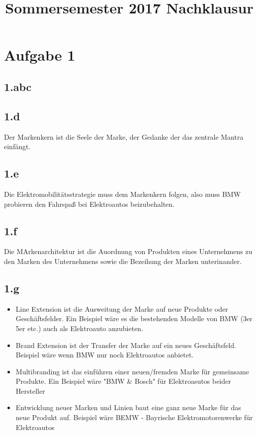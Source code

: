 

\title{Sommersemester 2017 Nachklausur}
\maketitle



\section{Aufgabe 1}
\subsection{1.abc}

\subsection{1.d}
    Der Markenkern ist die Seele der Marke, der Gedanke der das zentrale Mantra einfängt.

\subsection{1.e}
    Die Elektromobilitätsstrategie muss dem Markenkern folgen, also muss BMW probieren den Fahrspaß bei Elektroautos beizubehalten.

\subsection{1.f}
    Die MArkenarchitektur ist die Auordnung von Produkten eines Unternehmens zu den Marken des Unternehmens sowie die Bezeihung der Marken unterinander.

\subsection{1.g}
    \begin{itemize}
        \item Line Extension ist die Ausweitung der Marke auf neue Produkte oder Geschäftsfelder. Ein Beispiel wäre es die bestehenden Modelle von BMW (3er 5er etc.) auch als Elektroauto anzubieten.
        \item Brand Extension ist der Transfer der Marke auf ein neues Geschäftsfeld. Beispiel wäre wenn BMW nur noch Elektroautos anbietet.
        \item Multibranding ist das einführen einer neuen/fremden Marke für gemeinsame Produkte. Ein Beispiel wäre "BMW \& Bosch" für Elektroasutos beider Hersteller
        \item Entwicklung neuer Marken und Linien baut eine ganz neue Marke für das neue Produkt auf. Beispiel wäre BEMW - Bayrische Elektromotorenwerke für Elektroautos
    \end{itemize}

